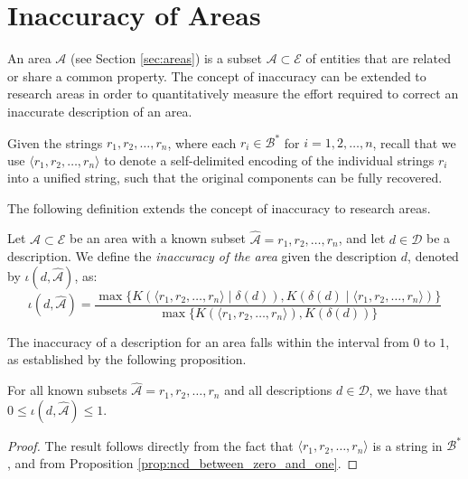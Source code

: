 %
%

\section{Inaccuracy of Areas}

An area $\mathcal{A}$ (see Section \ref{sec:areas}) is a subset $\mathcal{A} \subset \mathcal{E}$ of entities that are related or share a common property. The concept of inaccuracy can be extended to research areas in order to quantitatively measure the effort required to correct an inaccurate description of an area.

Given the strings $r_1, r_2, \ldots, r_n$, where each $r_i \in \mathcal{B}^\ast$ for $i = 1, 2, \ldots, n$, recall that we use $\langle r_1, r_2, \ldots, r_n \rangle$ to denote a self-delimited encoding of the individual strings $r_i$ into a unified string, such that the original components can be fully recovered.

The following definition extends the concept of inaccuracy to research areas.

\begin{definition}
Let $\mathcal{A} \subset \mathcal{E}$ be an area with a known subset $\hat{\mathcal{A}} = {r_1, r_2, \ldots, r_n}$, and let $d \in \mathcal{D}$ be a description. We define the \emph{inaccuracy of the area} given the description $d$, denoted by $\iota(d, \hat{\mathcal{A}})$, as:
\[
\iota(d, \hat{\mathcal{A}}) = \frac{ \max\{ K \left( \langle r_1, r_2, \ldots, r_n \rangle \mid \delta(d) \right), K \left( \delta(d) \mid \langle r_1, r_2, \ldots, r_n \rangle \right) \} } { \max\{ K(\langle r_1, r_2, \ldots, r_n \rangle), K \left(\delta(d) \right) \} }
\]
\end{definition}

The inaccuracy of a description for an area falls within the interval from $0$ to $1$, as established by the following proposition.

\begin{proposition}
\label{prop:inaccuracy:inaccuracy:range}
For all known subsets $\hat{\mathcal{A}} = {r_1, r_2, \ldots, r_n}$ and all descriptions $d \in \mathcal{D}$, we have that $0 \leq \iota(d, \hat{\mathcal{A}}) \leq 1$.
\end{proposition}
\begin{proof}
The result follows directly from the fact that $\langle r_1, r_2, \ldots, r_n \rangle$ is a string in $\mathcal{B}^\ast$, and from Proposition \ref{prop:ncd_between_zero_and_one}.
\end{proof}

